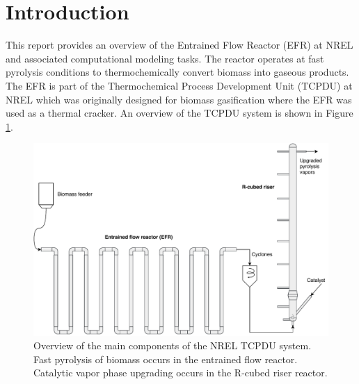 
\section{Introduction}

This report provides an overview of the Entrained Flow Reactor (EFR) at NREL and associated computational modeling tasks. The reactor operates at fast pyrolysis conditions to thermochemically convert biomass into gaseous products. The EFR is part of the Thermochemical Process Development Unit (TCPDU) at NREL which was originally designed for biomass gasification where the EFR was used as a thermal cracker. An overview of the TCPDU system is shown in Figure \ref{fig:tcpdu-system}.

\begin{figure}[H]
    \centering
    \includegraphics[width=\textwidth]{figures/tcpdu-system.pdf}
    \caption{Overview of the main components of the NREL TCPDU system. Fast pyrolysis of biomass occurs in the entrained flow reactor. Catalytic vapor phase upgrading occurs in the R-cubed riser reactor.}
    \label{fig:tcpdu-system}
\end{figure}
